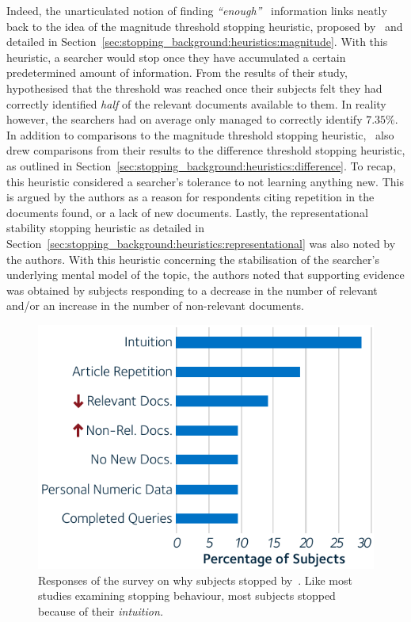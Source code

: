 Indeed, the unarticulated notion of finding \emph{``enough''}~\citep{zach2005enough_is_enough} information links neatly back to the idea of the magnitude threshold stopping heuristic, proposed by~\cite{nickles1995judgment} and detailed in Section~\ref{sec:stopping_background:heuristics:magnitude}. With this heuristic, a searcher would stop once they have accumulated a certain predetermined amount of information. From the results of their study,~\cite{dostert2009satisficing} hypothesised that the threshold was reached once their subjects felt they had correctly identified \emph{half} of the relevant documents available to them. In reality however, the searchers had on average only managed to correctly identify $7.35\%$. In addition to comparisons to the magnitude threshold stopping heuristic,~\cite{dostert2009satisficing} also drew comparisons from their results to the difference threshold stopping heuristic, as outlined in Section~\ref{sec:stopping_background:heuristics:difference}. To recap, this heuristic considered a searcher's tolerance to not learning anything new. This is argued by the authors as a reason for respondents citing repetition in the documents found, or a lack of new documents. Lastly, the representational stability stopping heuristic as detailed in Section~\ref{sec:stopping_background:heuristics:representational} was also noted by the authors. With this heuristic concerning the stabilisation of the searcher's underlying mental model of the topic, the authors noted that supporting evidence was obtained by subjects responding to a decrease in the number of relevant and/or an increase in the number of non-relevant documents.

\begin{figure}
    \begin{center}
    \vspace*{-10mm}
    \includegraphics[width=1\textwidth]{figures/ch3-respondents.pdf}
    \end{center}
    \vspace*{-4mm}
    \caption[Responses of a survey by~\cite{dostert2009satisficing}]{Responses of the survey on why subjects stopped by~\cite{dostert2009satisficing}. Like most studies examining stopping behaviour, most subjects stopped because of their \emph{intuition.}}
    \label{fig:stopping_respondents}
\end{figure}

